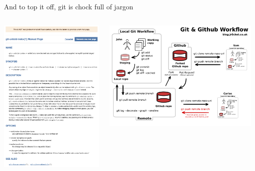 \documentclass[ignorenonframetext,notes, 10pt, aspectratio=169]{beamer}
\begin{document}
\begin{frame}{And to top it off, git is chock full of jargon}
\begin{columns}[T]
\begin{column}{0.4\textwidth}
\begin{overprint}
\includegraphics[width=\linewidth]{spoof-1.png}
\end{overprint}
\end{column}
\begin{column}{0.5\textwidth}
\includegraphics[width=\linewidth]{git-and-github-workflow.png}
\end{column}
\end{columns}

\end{frame}
\end{document}
